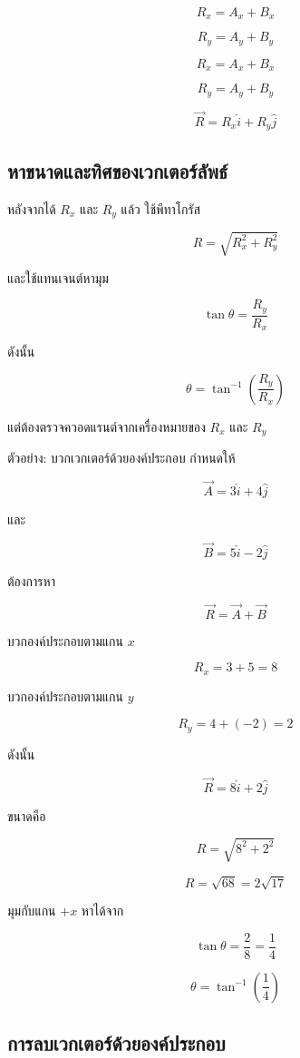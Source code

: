 \documentclass[12pt,a4paper]{report}
\begin{document}
\[
R_x=A_x+B_x
\]

\[
R_y=A_y+B_y
\]

\begin{tcolorbox}[title=สูตรบวกเวกเตอร์ด้วยองค์ประกอบ]
\[
R_x=A_x+B_x
\]

\[
R_y=A_y+B_y
\]

\[
\vec{R}=R_x\hat{i}+R_y\hat{j}
\]
\end{tcolorbox}

\subsection{หาขนาดและทิศของเวกเตอร์ลัพธ์}

หลังจากได้ $R_x$ และ $R_y$ แล้ว ใช้พีทาโกรัส

\[
R=\sqrt{R_x^2+R_y^2}
\]

และใช้แทนเจนต์หามุม

\[
\tan\theta=\frac{R_y}{R_x}
\]

ดังนั้น

\[
\theta=\tan^{-1}\left(\frac{R_y}{R_x}\right)
\]

แต่ต้องตรวจควอดแรนต์จากเครื่องหมายของ $R_x$ และ $R_y$

\begin{examplebox}{ตัวอย่าง: บวกเวกเตอร์ด้วยองค์ประกอบ}
กำหนดให้

\[
\vec{A}=3\hat{i}+4\hat{j}
\]

และ

\[
\vec{B}=5\hat{i}-2\hat{j}
\]

ต้องการหา

\[
\vec{R}=\vec{A}+\vec{B}
\]

บวกองค์ประกอบตามแกน $x$

\[
R_x=3+5=8
\]

บวกองค์ประกอบตามแกน $y$

\[
R_y=4+(-2)=2
\]

ดังนั้น

\[
\vec{R}=8\hat{i}+2\hat{j}
\]

ขนาดคือ

\[
R=\sqrt{8^2+2^2}
\]

\[
R=\sqrt{68}=2\sqrt{17}
\]

มุมกับแกน $+x$ หาได้จาก

\[
\tan\theta=\frac{2}{8}=\frac{1}{4}
\]

\[
\theta=\tan^{-1}\left(\frac{1}{4}\right)
\]
\end{examplebox}

\subsection{การลบเวกเตอร์ด้วยองค์ประกอบ}
\end{document}
